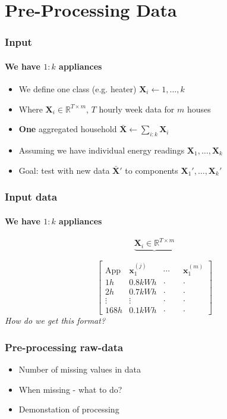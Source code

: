 \documentclass{beamer}              %
\begin{document}
\section{Pre-Processing Data}
\begin{frame}
\frametitle{Input}
\framesubtitle{We have $1:k$ appliances}
\begin{itemize}
\item{We define one class (e.g. heater) $\mathbf{X}_i \leftarrow 1,\dots, k$}
\item{Where $\mathbf{X}_i \in \mathbb{R}^{T \times m}$, $T$ hourly week data for $m$ houses}
\item{\textbf{One} aggregated household $\bar{\mathbf{X}} \leftarrow \sum_{i:k} \mathbf{X}_i$}
\item{Assuming we have individual energy readings $\mathbf{X}_1,\dots,\mathbf{X}_k$}
\item{Goal: test with new data $\bar{\mathbf{X}}'$ to components $\mathbf{X}_1',\dots,\mathbf{X}_k'$}
\end{itemize}
\end{frame}
\begin{frame}
\frametitle{Input data}
\framesubtitle{We have $1:k$ appliances}
\centering
\begin{equation*}
\underbrace{\mathbf{X}_i \in \mathbb{R}^{T \times m}}
\end{equation*}

\begin{equation*}
\begin{bmatrix}
\text{App} & \mathbf{x}_1^{(j)} & \cdots & & \mathbf{x}_1^{(m)}\\
1h & 0.8 kWh & \cdot & & \cdot \\
2h & 0.7 kWh & \cdot & & \cdot \\
\vdots & \vdots & \cdot & & \cdot \\
168h & 0.1kWh & \cdot & &  \cdot
\end{bmatrix}
\end{equation*}
\textit{How do we get this format?}
\end{frame}
\begin{frame}
	\frametitle{Pre-processing raw-data}
	\begin{itemize}
		\item{Number of missing values in data}
		\item{When missing - what to do?}
		\item{Demonstation of processing}
	\end{itemize}
\end{frame}
\end{document}
